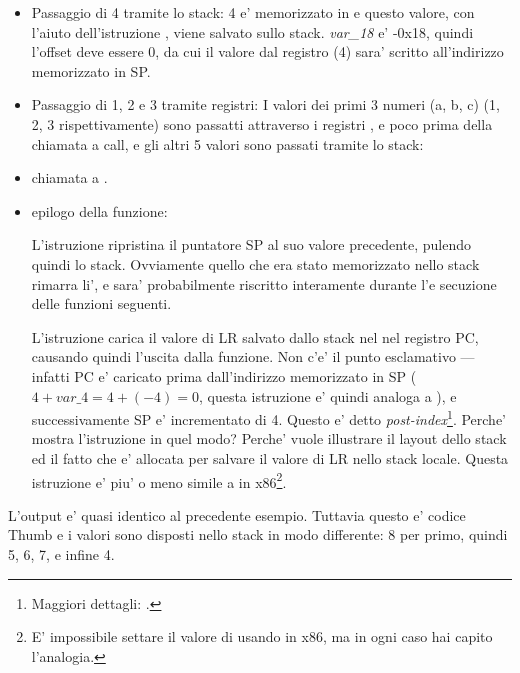 \begin{itemize}
\item Passaggio di 4 tramite lo stack: 4 e' memorizzato in  e questo valore, con l'aiuto dell'istruzione , viene salvato sullo stack.
\emph{var\_18} e' -0x18, quindi l'offset deve essere 0, da cui il valore dal registro  (4) sara' scritto all'indirizzo memorizzato in \ac{SP}.

\item Passaggio di 1, 2 e 3 tramite registri:
I valori dei primi 3 numeri (a, b, c) (1, 2, 3 rispettivamente) sono passatti attraverso i registri
,  e 
poco prima della chiamata a \printf call, e gli altri 5 valori sono passati tramite lo stack:

\item chiamata a \printf.

\item epilogo della funzione:

L'istruzione  ripristina il puntatore \ac{SP} al suo valore precedente, pulendo quindi lo stack.
Ovviamente quello che era stato memorizzato nello stack rimarra li', e sara' probabilmente riscritto interamente durante l'e
secuzione delle funzioni seguenti.

L'istruzione  carica il valore di \ac{LR} salvato dallo stack nel nel registro \ac{PC}, causando quindi
l'uscita dalla funzione.
Non c'e' il punto esclamativo ---infatti \ac{PC} e' caricato prima dall'indirizzo memorizzato in \ac{SP} ($4+var\_4=4+(-4)=0$, questa istruzione e' quindi analoga a ), e successivamente \ac{SP} e' incrementato di 4.
Questo e' detto \emph{post-index}\footnote{Maggiori dettagli: .}.
Perche' \IDA mostra l'istruzione in quel modo?
Perche' vuole illustrare il layout dello stack ed il fatto che  e' allocata per salvare il valore di \ac{LR} nello stack locale.
Questa istruzione e' piu' o meno simile a  in x86\footnote{E' impossibile settare il valore di  usando \POP in x86, ma in ogni caso hai capito l'analogia.}.

\end{itemize}

\myparagraph{\OptimizingKeilVI: \ThumbMode}



L'output e' quasi identico al precedente esempio. Tuttavia questo e' codice Thumb e i valori sono disposti nello stack in modo differente:
8 per primo, quindi 5, 6, 7, e infine 4.

